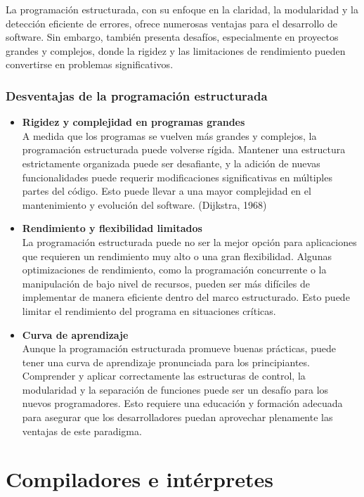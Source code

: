 La programación estructurada, con su enfoque en la claridad, la modularidad y la detección eficiente de errores, ofrece numerosas ventajas para el desarrollo de software. Sin embargo, también presenta desafíos, especialmente en proyectos grandes y complejos, donde la rigidez y las limitaciones de rendimiento pueden convertirse en problemas significativos.

\subsubsection{Desventajas de la programación estructurada}

\begin{itemize}
  \item \textbf{Rigidez y complejidad en programas grandes} \\
  A medida que los programas se vuelven más grandes y complejos, la programación estructurada puede volverse rígida. Mantener una estructura estrictamente organizada puede ser desafiante, y la adición de nuevas funcionalidades puede requerir modificaciones significativas en múltiples partes del código. Esto puede llevar a una mayor complejidad en el mantenimiento y evolución del software. (Dijkstra, 1968)
  \item \textbf{Rendimiento y flexibilidad limitados} \\
  La programación estructurada puede no ser la mejor opción para aplicaciones que requieren un rendimiento muy alto o una gran flexibilidad. Algunas optimizaciones de rendimiento, como la programación concurrente o la manipulación de bajo nivel de recursos, pueden ser más difíciles de implementar de manera eficiente dentro del marco estructurado. Esto puede limitar el rendimiento del programa en situaciones críticas. \parencite{Dijkstra1968}
  \item \textbf{Curva de aprendizaje} \\
  Aunque la programación estructurada promueve buenas prácticas, puede tener una curva de aprendizaje pronunciada para los principiantes. Comprender y aplicar correctamente las estructuras de control, la modularidad y la separación de funciones puede ser un desafío para los nuevos programadores. Esto requiere una educación y formación adecuada para asegurar que los desarrolladores puedan aprovechar plenamente las ventajas de este paradigma. \parencite{Dijkstra1968}
\end{itemize}

\section{Compiladores e intérpretes}
